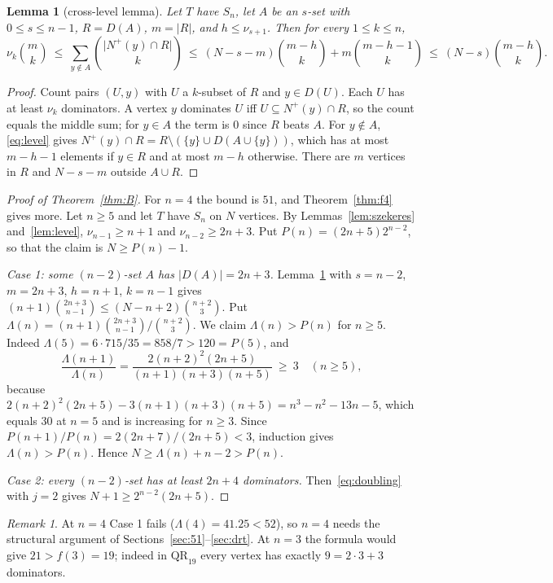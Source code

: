 \documentclass[11pt]{amsart}
\newtheorem{lemma}[theorem]{Lemma}
\theoremstyle{definition}
\theoremstyle{remark}
\newtheorem{remark}[theorem]{Remark}
\newcommand{\D}{D}
\newcommand{\Nout}{N^{+}}
\newcommand{\QR}{\mathrm{QR}}
\newcommand{\abs}[1]{\lvert #1\rvert}
\begin{document}
\begin{lemma}[cross-level lemma]\label{lem:cross}
Let $T$ have $S_n$, let $A$ be an $s$-set with $0\le s\le n-1$, $R=\D(A)$, $m=\abs{R}$, and $h\le\nu_{s+1}$. Then for every
$1\le k\le n$,
\[
  \nu_k\binom{m}{k}\ \le\ \sum_{y\notin A}\binom{\abs{\Nout(y)\cap R}}{k}\ \le\ (N-s-m)\binom{m-h}{k}+m\binom{m-h-1}{k}\
  \le\ (N-s)\binom{m-h}{k}.
\]
\end{lemma}

\begin{proof}
Count pairs $(U,y)$ with $U$ a $k$-subset of $R$ and $y\in\D(U)$. Each $U$ has at least $\nu_k$ dominators. A vertex $y$
dominates $U$ iff $U\subseteq\Nout(y)\cap R$, so the count equals the middle sum; for $y\in A$ the term is $0$ since $R$ beats $A$.
For $y\notin A$, \eqref{eq:level} gives $\Nout(y)\cap R=R\setminus(\{y\}\cup\D(A\cup\{y\}))$, which has at most $m-h-1$ elements
if $y\in R$ and at most $m-h$ otherwise. There are $m$ vertices in $R$ and $N-s-m$ outside $A\cup R$.
\end{proof}

\begin{proof}[Proof of Theorem~\ref{thm:B}]
For $n=4$ the bound is $51$, and Theorem~\ref{thm:f4} gives more. Let $n\ge 5$ and let $T$ have $S_n$ on $N$ vertices. By
Lemmas~\ref{lem:szekeres} and~\ref{lem:level}, $\nu_{n-1}\ge n+1$ and $\nu_{n-2}\ge 2n+3$. Put $P(n)=(2n+5)2^{n-2}$, so that the
claim is $N\ge P(n)-1$.

\emph{Case 1: some $(n-2)$-set $A$ has $\abs{\D(A)}=2n+3$.} Lemma~\ref{lem:cross} with $s=n-2$, $m=2n+3$, $h=n+1$, $k=n-1$ gives
$(n+1)\binom{2n+3}{n-1}\le (N-n+2)\binom{n+2}{3}$. Put $\Lambda(n)=(n+1)\binom{2n+3}{n-1}/\binom{n+2}{3}$. We claim $\Lambda(n)>P(n)$ for
$n\ge 5$. Indeed $\Lambda(5)=6\cdot 715/35=858/7>120=P(5)$, and
\[
  \frac{\Lambda(n+1)}{\Lambda(n)}=\frac{2(n+2)^2(2n+5)}{(n+1)(n+3)(n+5)}\ \ge\ 3 \quad(n\ge 5),
\]
because $2(n+2)^2(2n+5)-3(n+1)(n+3)(n+5)=n^3-n^2-13n-5$, which equals $30$ at $n=5$ and is increasing for $n\ge 3$. Since
$P(n+1)/P(n)=2(2n+7)/(2n+5)<3$, induction gives $\Lambda(n)>P(n)$. Hence $N\ge\Lambda(n)+n-2>P(n)$.

\emph{Case 2: every $(n-2)$-set has at least $2n+4$ dominators.} Then~\eqref{eq:doubling} with $j=2$ gives
$N+1\ge 2^{n-2}(2n+5)$.
\end{proof}

\begin{remark}
At $n=4$ Case 1 fails ($\Lambda(4)=41.25<52$), so $n=4$ needs the structural argument of Sections~\ref{sec:51}--\ref{sec:drt}. At
$n=3$ the formula would give $21>f(3)=19$; indeed in $\QR_{19}$ every vertex has exactly $9=2\cdot3+3$ dominators.
\end{remark}
\end{document}
